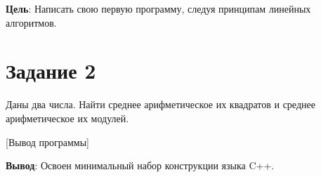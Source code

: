 \documentclass[variant=labwork]{bsuir}
\begin{document}
\maketitle
\mainmatter

\textbf{Цель}: Написать свою первую программу, следуя принципам линейных
алгоритмов.

\section*{Задание 2}

Даны два числа. Найти среднее арифметическое их квадратов и среднее
арифметическое их модулей.


[Вывод программы]


\textbf{Вывод}: Освоен минимальный набор конструкции языка C++.
\end{document}
